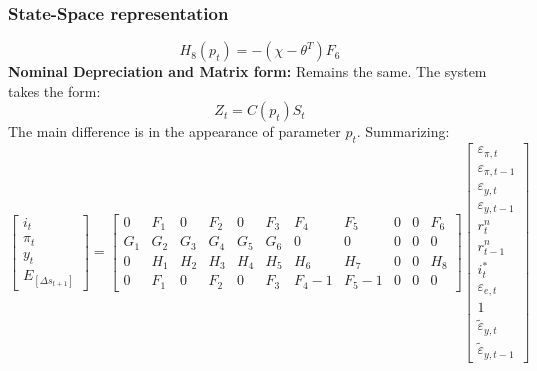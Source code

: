 \documentclass{beamer}
\begin{document}
\begin{frame}
\frametitle{State-Space representation}
\begin{equation}
H_8 (p_t) = - (\chi - \theta^T) F_6
\end{equation}
\newline
\newline
\textbf{Nominal Depreciation and Matrix form: } Remains the same. The system
takes the form:
\begin{equation}
Z_t = C (p_t) S_t
\end{equation}
The main difference is in the appearance of parameter $p_t$. Summarizing:
\tiny
\begin{equation}
\begin{bmatrix}
i_t \\
\pi_t \\ 
y_t \\
E_[\Delta s_{t+1}]
\end{bmatrix}
=
\begin{bmatrix}
0 & F_1 & 0 & F_2 & 0 & F_3 & F_4 & F_5 & 0 & 0 & F_6 \\
G_1 & G_2 & G_3 & G_4 & G_5 & G_6 & 0 & 0 & 0 & 0 & 0 \\
0 & H_1 & H_2 & H_3 & H_4 & H_5 & H_6 & H_7 & 0 & 0 & H_8 \\
0 & F_1 & 0 & F_2 & 0 & F_3 & F_4-1 & F_5-1 & 0 & 0 & 0
\end{bmatrix}
\begin{bmatrix}
\varepsilon_{\pi,t} \\
\varepsilon_{\pi,t-1} \\
\varepsilon_{y,t} \\
\varepsilon_{y,t-1} \\
r_t^n \\
r_{t-1}^n \\
i_t^* \\
\varepsilon_{e,t} \\
1 \\
\tilde{\varepsilon}_{y,t} \\
\tilde{\varepsilon}_{y,t-1}
\end{bmatrix}
\end{equation}
\end{frame}
\end{document}
